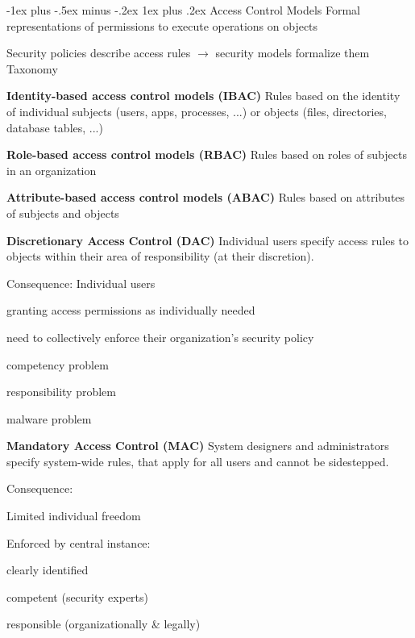 \documentclass[a4paper]{article}
\makeatletter
\renewcommand{\note}[2]{\begin{noteBox} \textbf{#1} #2 \end{noteBox}}
\renewcommand{\subsubsection}{\@startsection{subsubsection}{3}{0mm}%
                                {-1ex plus -.5ex minus -.2ex}%
                                {1ex plus .2ex}%
                                {\normalfont\small\bfseries}}
\makeatother
\begin{document}
\begin{multicols}{3}
    \subsubsection{Access Control Models}
    Formal representations of permissions to execute operations on objects

    Security policies describe access rules $\rightarrow$ security models formalize them Taxonomy
    \note{Identity-based access control models (IBAC)}{Rules based on the identity of individual subjects (users, apps, processes, ...) or objects (files, directories, database tables, ...)}

    \note{Role-based access control models (RBAC)}{Rules based on roles of subjects in an organization}

    \note{Attribute-based access control models (ABAC)}{Rules based on attributes of subjects and objects}

    \note{Discretionary Access Control (DAC)}{Individual users specify access rules to objects within their area of responsibility (at their discretion).}
    Consequence: Individual users
    \begin{itemize*}
        \item granting access permissions as individually needed
        \item need to collectively enforce their organization’s security policy
        \begin{itemize*}
            \item competency problem
            \item responsibility problem
            \item malware problem
        \end{itemize*}
    \end{itemize*}

    \note{Mandatory Access Control (MAC)}{System designers and administrators specify system-wide rules, that apply for all users and cannot be sidestepped.}
    Consequence:
    \begin{itemize*}
        \item Limited individual freedom
        \item Enforced by central instance:
        \begin{itemize*}
            \item clearly identified
            \item competent (security experts)
            \item responsible (organizationally \& legally)
        \end{itemize*}
    \end{itemize*}


\end{multicols}
\end{document}
